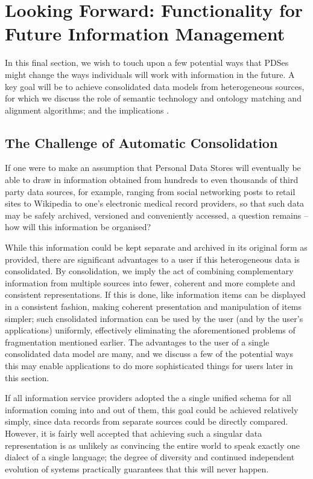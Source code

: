 \documentclass[graybox]{svmult}
\begin{document}
\section{Looking Forward: Functionality for Future Information Management}

In this final section, we wish to touch upon a few potential ways that PDSes might change the ways individuals will work with information in the future.  A key goal will be to achieve consolidated data models from heterogeneous sources, for which we discuss the role of semantic technology and ontology matching and alignment algorithms; and the implications .

\subsection{The Challenge of Automatic Consolidation}

If one were to make an assumption that Personal Data Stores will eventually be able to draw in information obtained from hundreds to even thousands of third party data sources, for example, ranging from social networking posts to retail sites to Wikipedia to one’s electronic medical record providers, so that such data may be safely archived, versioned and conveniently accessed, a question remains -- how will this information be organised?

While this information could be kept separate and archived in its original form as provided, there are significant advantages to a user if this heterogeneous data is consolidated.  By consolidation, we imply the act of combining complementary information from multiple sources into fewer, coherent and more complete and consistent representations.  If this is done, like information items can be displayed in a consistent fashion, making coherent presentation and manipulation of items simpler; such cnsolidated information can be used by the user (and by the user’s applications) uniformly, effectively eliminating the  aforementioned problems of fragmentation mentioned earlier. The advantages to the user of  a single consolidated data model are many, and we discuss a few of the potential ways this may enable applications to do more sophisticated things for users later in this section.

If all information service providers adopted the a single unified schema for all information coming into and out of them, this goal could be achieved relatively simply, since data records from separate sources could be directly compared.  However, it is fairly well accepted that achieving such a singular data representation is as unlikely as convincing the entire world to speak exactly one dialect of a single language; the degree of diversity and continued independent evolution of systems practically guarantees that this will never happen\cite{}. 
\end{document}
